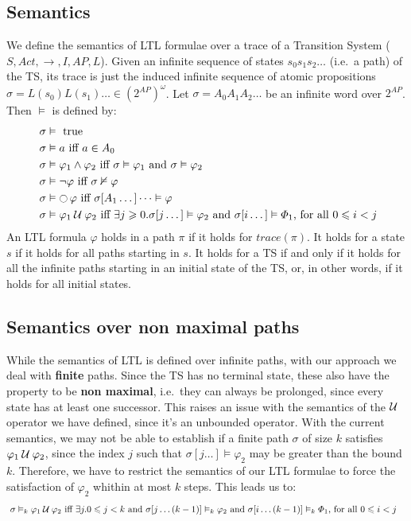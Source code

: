 \documentclass{article}
\begin{document}
\subsection*{Semantics}
We define the semantics of LTL formulae over a trace of a Transition System ($S, Act, \rightarrow, I, AP, L$). 
Given an infinite sequence of states $s_0s_1s_2 \dots$ (i.e.~a path) of the TS, 
its trace is just the induced infinite sequence of atomic propositions $ \sigma = L(s_0)L(s_1) \dots \in (2^{AP})^{\omega}$.
Let $\sigma = A_0A_1A_2 \dots$ be an infinite word over $2^{AP}$. Then $\vDash$ is defined by:
\begin{align*}
    &\; \sigma \vDash \text{ true} \\
    &\; \sigma \vDash a \text{ iff } a \in A_0 \\
    &\; \sigma \vDash \varphi_1 \land \varphi_2 \text{ iff } \sigma \vDash \varphi_1 \text{ and } \sigma \vDash \varphi_2 \\
    &\; \sigma \vDash \neg \varphi \text{ iff } \sigma \nvDash \varphi \\
    &\; \sigma \vDash \mathop{\ocircle}{\varphi} \text{ iff } \sigma [A_1 \dots] \dots \vDash \varphi \\
    &\; \sigma \vDash \varphi_1 \mathbin{\mathcal{U}} \varphi_2 \text{ iff } \exists j \geqslant 0 .  \sigma [ j \dots ] \vDash \varphi_2 \text{ and } \sigma [ i \dots ] \vDash \varPhi_1 \text{, for all } 0 \leqslant  i < j
\end{align*}
An LTL formula $\varphi$ holds in a path $\pi$ if it holds for $trace(\pi)$. 
It holds for a state $s$ if it holds for all paths starting in $s$.
It holds for a TS if and only if it holds for all the infinite paths 
starting in an initial state of the TS, or, in other words, if it holds for all initial states.

\subsection*{Semantics over non maximal paths}
While the semantics of LTL is defined over infinite paths, with our approach we deal with \textbf{finite} paths. Since the TS has no terminal state, these also have the property to be \textbf{non maximal}, i.e.~they can always be prolonged, since every state has at least one successor. This raises an issue with the semantics of the $\mathbin{\mathcal{U}}$ operator we have defined, since it's an unbounded operator. With the current semantics, we may not be able to establish if a finite path $\sigma$ of size $k$ satisfies $\varphi_1 \mathbin{\mathcal{U}} \varphi_2$, since the index $j$ such that $\sigma [ j \dots ] \vDash \varphi_2$ may be greater than the bound $k$. Therefore, we have to restrict the semantics of our LTL formulae to force the satisfaction of $\varphi_2$ whithin at most $k$ steps. This leads us to:
\begin{align*}
    &\; \sigma \vDash_k \varphi_1 \mathbin{\mathcal{U}} \varphi_2 \text{ iff } \exists j. 0 \leqslant j < k \text{ and }  \sigma [ j \dots (k-1)] \vDash_k \varphi_2 \text{ and } \sigma [ i \dots (k-1)] \vDash_k \varPhi_1 \text{, for all } 0 \leqslant  i < j
\end{align*}
\end{document}
